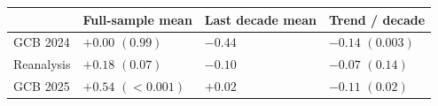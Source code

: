   \begin{tabular}{llll}
    \hline
     & Full-sample mean & Last decade mean & Trend / decade \\
    \hline
    GCB 2024 & $+0.00$ $(0.99)$ & $-0.44$ & $-0.14$ $(0.003)$ \\
    Reanalysis & $+0.18$ $(0.07)$ & $-0.10$ & $-0.07$ $(0.14)$ \\
    GCB 2025 & $+0.54$ $(<0.001)$ & $+0.02$ & $-0.11$ $(0.02)$ \\
    \hline
  \end{tabular}
